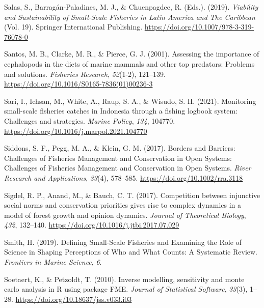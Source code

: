\documentclass[
]{article}
\newlength{\cslhangindent}
\newlength{\cslentryspacingunit} %
\newenvironment{CSLReferences}[2] %
 {%
  \setlength{\parindent}{0pt}
  \ifodd #1
  \let\oldpar\par
  \def\par{\hangindent=\cslhangindent\oldpar}
  \fi
  \setlength{\parskip}{#2\cslentryspacingunit}
 }%
 {}
\begin{document}
\begin{CSLReferences}{1}{2}
\leavevmode{}%
Salas, S., Barragán-Paladines, M. J., \& Chuenpagdee, R. (Eds.). (2019). \emph{Viability and {Sustainability} of {Small}-{Scale} {Fisheries} in {Latin} {America} and {The} {Caribbean}} (Vol. 19). Springer International Publishing. \url{https://doi.org/10.1007/978-3-319-76078-0}

\leavevmode{}%
Santos, M. B., Clarke, M. R., \& Pierce, G. J. (2001). Assessing the importance of cephalopods in the diets of marine mammals and other top predators: Problems and solutions. \emph{Fisheries Research}, \emph{52}(1-2), 121--139. \url{https://doi.org/10.1016/S0165-7836(01)00236-3}

\leavevmode{}%
Sari, I., Ichsan, M., White, A., Raup, S. A., \& Wisudo, S. H. (2021). Monitoring small-scale fisheries catches in {Indonesia} through a fishing logbook system: {Challenges} and strategies. \emph{Marine Policy}, \emph{134}, 104770. \url{https://doi.org/10.1016/j.marpol.2021.104770}

\leavevmode{}%
Siddons, S. F., Pegg, M. A., \& Klein, G. M. (2017). Borders and {Barriers}: Challenges of {Fisheries} {Management} and {Conservation} in {Open} {Systems}: {Challenges} of {Fisheries} {Management} and {Conservation} in {Open} {Systems}. \emph{River Research and Applications}, \emph{33}(4), 578--585. \url{https://doi.org/10.1002/rra.3118}

\leavevmode{}%
Sigdel, R. P., Anand, M., \& Bauch, C. T. (2017). Competition between injunctive social norms and conservation priorities gives rise to complex dynamics in a model of forest growth and opinion dynamics. \emph{Journal of Theoretical Biology}, \emph{432}, 132--140. \url{https://doi.org/10.1016/j.jtbi.2017.07.029}

\leavevmode{}%
Smith, H. (2019). Defining {Small}-{Scale} {Fisheries} and {Examining} the {Role} of {Science} in {Shaping} {Perceptions} of {Who} and {What} {Counts}: {A} {Systematic} {Review}. \emph{Frontiers in Marine Science}, \emph{6}.

\leavevmode{}%
Soetaert, K., \& Petzoldt, T. (2010). Inverse modelling, sensitivity and monte carlo analysis in {R} using package {FME}. \emph{Journal of Statistical Software}, \emph{33}(3), 1--28. \url{https://doi.org/10.18637/jss.v033.i03}


\end{CSLReferences}
\end{document}
